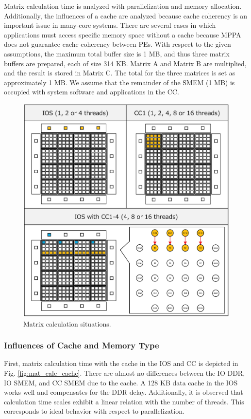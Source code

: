   Matrix calculation time is analyzed with parallelization and memory allocation.
  Additionally, the influences of a cache are analyzed because cache coherency is an important issue in many-core systems.
  There are several cases in which applications must access specific memory space without a cache because MPPA does not guarantee cache coherency between PEs.
  With respect to the given assumptions, the maximum total buffer size is 1 MB, and thus three matrix buffers are prepared, each of size 314 KB.
  Matrix A and Matrix B are multiplied, and the result is stored in Matrix C.
  The total for the three matrices is set as approximately 1 MB.
  We assume that the remainder of the SMEM (1 MB) is occupied with system software and applications in the CC.
  
  \begin{figure}[t]
    \centering
  \includegraphics[width=1.0\linewidth]{../figure/matrix_calculation.eps}
    \caption{\label{fig:mat_calc}
      Matrix calculation situations.}
  \end{figure}
  
  \subsubsection{Influences of Cache and Memory Type}
  \label{sec:cache_and_memory}
  First, matrix calculation time with the cache in the IOS and CC is depicted in Fig. \ref{fig:mat_calc_cache}.
  There are almost no differences between the IO DDR, IO SMEM, and CC SMEM due to the cache.
  A 128 KB data cache in the IOS works well and compensates for the DDR delay.
  Additionally, it is observed that calculation time scales exhibit a linear relation with the number of threads.
  This corresponds to ideal behavior with respect to parallelization.
  

